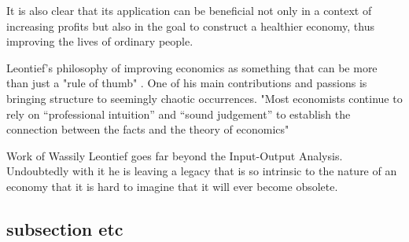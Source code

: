 \documentclass[12pt,a4paper]{scrartcl}
\begin{document}
	It is also clear that its application can be beneficial not only in a context of increasing profits but also in the goal to construct a healthier economy, thus improving the lives of ordinary people.
	
	
	
	Leontief's philosophy of improving economics as something that can be more than just a "rule of thumb" \cite[p.~36]{leontief1960niedergang}.
	One of his main contributions and passions is bringing structure to seemingly chaotic occurrences. 	"Most economists continue to rely on “professional intuition” and “sound judgement” to establish the connection between the facts and the theory of economics" \cite[p.~13]{leontief1951input}
	
	Work of Wassily Leontief goes far beyond the Input-Output Analysis. Undoubtedly with it he is leaving a legacy that is so intrinsic to the nature of an economy that it is hard to imagine that it will ever become obsolete.




	
	
	
	\subsection{subsection etc}
	
		
	\listoftodos

	
	
\end{document}
